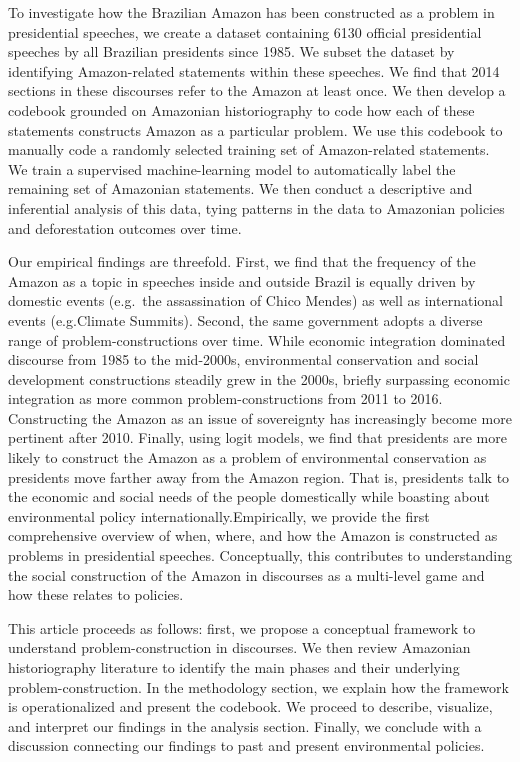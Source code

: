 \documentclass[
  12pt,
]{article}
\begin{document}
To investigate how the Brazilian Amazon has been constructed as a
problem in presidential speeches, we create a dataset containing 6130
official presidential speeches by all Brazilian presidents since 1985.
We subset the dataset by identifying Amazon-related statements within
these speeches. We find that 2014 sections in these discourses refer to
the Amazon at least once. We then develop a codebook grounded on
Amazonian historiography to code how each of these statements constructs
Amazon as a particular problem. We use this codebook to manually code a
randomly selected training set of Amazon-related statements. We train a
supervised machine-learning model to automatically label the remaining
set of Amazonian statements. We then conduct a descriptive and
inferential analysis of this data, tying patterns in the data to
Amazonian policies and deforestation outcomes over time.

Our empirical findings are threefold. First, we find that the frequency
of the Amazon as a topic in speeches inside and outside Brazil is
equally driven by domestic events (e.g.~the assassination of Chico
Mendes) as well as international events (e.g.Climate Summits). Second,
the same government adopts a diverse range of problem-constructions over
time. While economic integration dominated discourse from 1985 to the
mid-2000s, environmental conservation and social development
constructions steadily grew in the 2000s, briefly surpassing economic
integration as more common problem-constructions from 2011 to 2016.
Constructing the Amazon as an issue of sovereignty has increasingly
become more pertinent after 2010. Finally, using logit models, we find
that presidents are more likely to construct the Amazon as a problem of
environmental conservation as presidents move farther away from the
Amazon region. That is, presidents talk to the economic and social needs
of the people domestically while boasting about environmental policy
internationally.Empirically, we provide the first comprehensive overview
of when, where, and how the Amazon is constructed as problems in
presidential speeches. Conceptually, this contributes to understanding
the social construction of the Amazon in discourses as a multi-level
game and how these relates to policies.

This article proceeds as follows: first, we propose a conceptual
framework to understand problem-construction in discourses. We then
review Amazonian historiography literature to identify the main phases
and their underlying problem-construction. In the methodology section,
we explain how the framework is operationalized and present the
codebook. We proceed to describe, visualize, and interpret our findings
in the analysis section. Finally, we conclude with a discussion
connecting our findings to past and present environmental policies.
\end{document}
